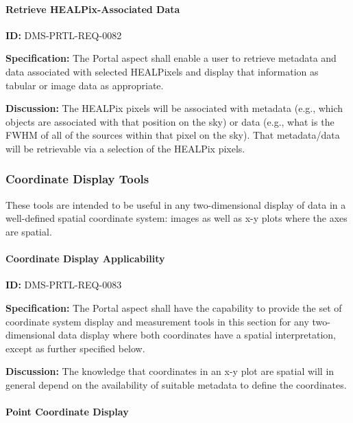 \documentclass[SE,toc]{lsstdoc}
\begin{document}
\paragraph{Retrieve HEALPix-Associated Data}\hfill  %

\label{DMS-PRTL-REQ-0082}
\textbf{ID:} DMS-PRTL-REQ-0082

\textbf{Specification:}
The Portal aspect shall enable a user to retrieve metadata and data associated with selected HEALPixels and display that information as tabular or image data as appropriate.

\textbf{Discussion:}
The HEALPix pixels will be associated with metadata (e.g., which objects are associated with that position on the sky) or data (e.g., what is the FWHM of all of the sources within that pixel on the sky).  That metadata/data will be retrievable via a selection of the HEALPix pixels.

\subsubsection{Coordinate Display Tools}

These tools are intended to be useful in any two-dimensional display of data in a well-defined spatial coordinate system: images as well as x-y plots where the axes are spatial.

\paragraph{Coordinate Display Applicability}\hfill  %

\label{DMS-PRTL-REQ-0083}
\textbf{ID:} DMS-PRTL-REQ-0083

\textbf{Specification:}
The Portal aspect shall have the capability to provide the set of coordinate system display and measurement tools in this section for any two-dimensional data display where both coordinates have a spatial interpretation, except as further specified below.

\textbf{Discussion:}
The knowledge that coordinates in an x-y plot are spatial will in general depend on the availability of suitable metadata to define the coordinates.

\paragraph{Point Coordinate Display}\hfill  %
\end{document}
